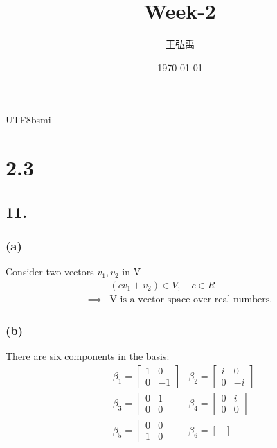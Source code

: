 \documentclass[12pt, a4paper]{article}
\title{\textbf{Week-2}}
\author{王弘禹}
\date\today
\begin{document}
\begin{CJK*}{UTF8}{bsmi}
\linespread{1.5}
\maketitle
\newcommand{\st}[1]{\section*{#1}}
\newcommand{\sst}[1]{\subsection*{#1}}
\newcommand{\ssst}[1]{\subsubsection*{#1}}
\newcommand{\dsp}{\displaystyle}
\newcommand{\dx}{\,dx}
\newcommand{\dphi}{\,d\phi}
\newcommand{\dtheta}{\,d\theta}
\newcommand{\dy}{\,dy}
\newcommand{\dz}{\,dz}
\newcommand{\dr}{\,dr}
\newcommand{\drho}{\,d\rho}
\newcommand{\tb}{\textbf}
\st{2.3}
\sst{11.}
\ssst{(a)}
Consider two vectors \(v_1,v_2\) in V
\begin{align}
    &(cv_1+v_2)\in V,\quad c\in R\\
    \implies & \text{V is a vector space over real numbers.}
\end{align}
\ssst{(b)}
There are six components in the basis:\begin{align}
    &\beta_1 = \begin{bmatrix}
        1 & 0\\
        0 & -1
    \end{bmatrix} &\beta_2 = \begin{bmatrix}
        i & 0\\
        0 & -i
    \end{bmatrix}\\
    &\beta_3 = \begin{bmatrix}
        0 & 1\\
        0 & 0
    \end{bmatrix} &\beta_4 = \begin{bmatrix}
        0 & i \\
        0 & 0
    \end{bmatrix}\\
    &\beta_5 = \begin{bmatrix}
        0 & 0\\
        1 & 0 
    \end{bmatrix} &\beta_6 = \begin{bmatrix}

\end{bmatrix}
\end{align}
\end{CJK*}
\end{document}
